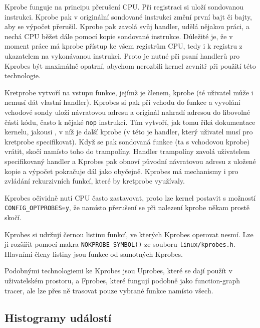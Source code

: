 Kprobe funguje na principu přerušení CPU. Při registraci si uloží sondovanou instrukci. Kprobe pak v originální sondované instrukci změní první bajt či bajty, aby se výpočet přerušil. Kprobe pak zavolá svůj handler, udělá nějakou práci, a nechá CPU běžet dále pomocí kopie sondované instrukce. Důležité je, že v moment práce má kprobe přístup ke všem registrům CPU, tedy i k registru z ukazatelem na vykonávanou instrukci. Proto je nutné při psaní handlerů pro Kprobes být maximálně opatrní, abychom nerozbili kernel zevnitř při použití této technologie.

Kretprobe vytvoří na vstupu funkce, jejímž je členem, kprobe (té uživatel může i nemusí dát vlastní handler). Kprobes si pak při vchodu do funkce a vyvolání vchodové sondy uloží návratovou adresu a originál nahradí adresou do libovolné části kódu, často k nějaké \texttt{nop} instrukci. Tím vytvoří, jak tomu říká dokumentace kernelu, jakousi , v níž je další kprobe (v této je handler, který uživatel musí pro kretprobe specifikovat). Když se pak sondovaná funkce (ta s vchodovou kprobe) vrátit, skočí namísto toho do trampolíny. Handler trampolíny zavolá uživatelem specifikovaný handler a Kprobes pak obnoví původní návratovou adresu z uložené kopie a výpočet pokračuje dál jako obyčejně. Kprobes má mechanismy i pro zvládání rekurzivních funkcí, které by kretprobe využívaly.

Kprobes očividně nutí CPU často zastavovat, proto lze kernel postavit s možností \texttt{CONFIG\_OPTPROBES=y}, že namísto přerušení se při nalezení kprobe někam prostě skočí. 

Kprobes si udržují černou listinu funkcí, ve kterých Kprobes operovat nesmí. Lze ji rozšířit pomocí makra \texttt{NOKPROBE\_SYMBOL()} ze souboru \texttt{linux/kprobes.h}. Hlavními členy listiny jsou funkce od samotných Kprobes.

Podobnými technologiemi ke Kprobes jsou Uprobes, které se dají použít v uživatelském prostoru, a Fprobes, které fungují podobně jako function-graph tracer, ale lze přes ně trasovat pouze vybrané funkce namísto všech.

\subsection{Histogramy událostí}
\label{histogramy-událostí}


